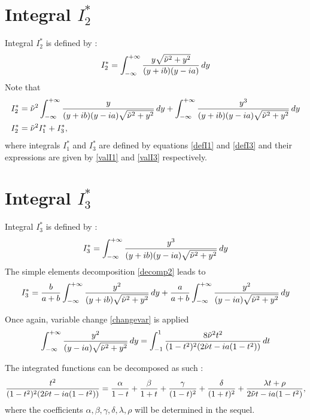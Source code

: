 \section{Integral $I_2^*$}
\label{calcI2}
Integral $I_2^*$ is defined by :
\begin{equation}
I_2^*=  \int_{-\infty}^{+\infty} \frac{y\sqrt{\tilde{\nu}^2+y^2}}{(y+ib)(y-ia)}\, dy
\label{defI2}
\end{equation}
Note that
\begin{equation*}
\begin{split}
I_2^*&=\tilde{\nu}^2 \int_{-\infty}^{+\infty}  \frac{y}{(y+ib)(y-ia)\sqrt{\tilde{\nu}^2+y^2}}\,dy+ \int_{-\infty}^{+\infty} \frac{y^3}{(y+ib)(y-ia)\sqrt{\tilde{\nu}^2+y^2}} \, dy\\
I_2^*&=\tilde{\nu}^2 I_1^*+I_3^*,
\end{split}
\end{equation*}
where integrals $I_1^*$ and $I_3^*$ are defined by equations \eqref{defI1} and \eqref{defI3} and their expressions are given by \eqref{valI1} and \eqref{valI3} respectively.

\section{Integral $I_3^*$}
\label{calcI3}
Integral $I_3^*$ is defined by :
\begin{equation}
I_3^*=\int_{-\infty}^{+\infty} \frac{y^3}{(y+ib)(y-ia)\sqrt{\tilde{\nu}^2+y^2}} \,dy
\label{defI3}
\end{equation}
The simple elements decomposition \eqref{decomp2} leads to
\begin{equation}
I_3^*=\frac{b}{a+b}\int_{-\infty}^{+\infty} \frac{y^2}{(y+ib)\sqrt{\tilde{\nu}^2+y^2}} \, dy +\frac{a}{a+b}\int_{-\infty}^{+\infty} \frac{y^2}{(y-ia)\sqrt{\tilde{\nu}^2+y^2}} \, dy
\label{decompI3}
\end{equation}

Once again, variable change \eqref{changevar} is applied
\begin{equation}
 \int_{-\infty}^{+\infty} \frac{y^2}{(y-ia)\sqrt{\tilde{\nu}^2+y^2}} \,dy = \int_{-1}^1 \frac{8\tilde{\nu}^2t^2}{(1-t^2)^2(2\tilde{\nu} t -ia(1-t^2))} \, dt
\end{equation}

The integrated functions can be decomposed as such :
\begin{equation}
\frac{t^2}{(1-t^2)^2(2\tilde{\nu} t -ia(1-t^2))}=\frac{\alpha}{1-t}+\frac{\beta}{1+t}+ \frac{\gamma}{(1-t)^2}+\frac{\delta}{(1+t)^2} +\frac{\lambda t + \rho }{2\tilde{\nu} t-ia(1-t^2)},
\label{elemsimpl3}
\end{equation}
where the coefficients $\alpha,\beta,\gamma,\delta,\lambda,\rho$ will be determined in the sequel.

